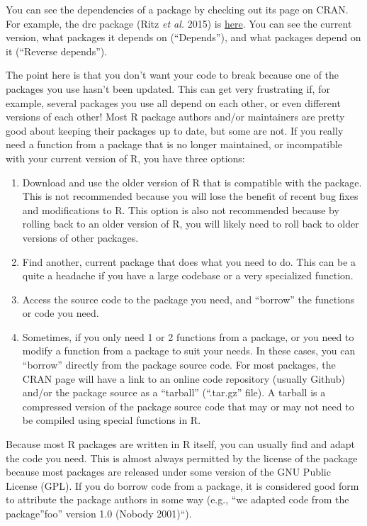 \documentclass[
  13,
  letterpaper,
]{report}
\begin{document}
You can see the dependencies of a package by checking out its page on
CRAN. For example, the drc package (Ritz \emph{et al.} 2015) is
\href{https://cran.r-project.org/web/packages/drc/index.html}{here}. You
can see the current version, what packages it depends on (``Depends''),
and what packages depend on it (``Reverse depends'').

The point here is that you don't want your code to break because one of
the packages you use hasn't been updated. This can get very frustrating
if, for example, several packages you use all depend on each other, or
even different versions of each other! Most R package authors and/or
maintainers are pretty good about keeping their packages up to date, but
some are not. If you really need a function from a package that is no
longer maintained, or incompatible with your current version of R, you
have three options:

\begin{enumerate}
\def\labelenumi{\arabic{enumi}.}
\item
  Download and use the older version of R that is compatible with the
  package. This is not recommended because you will lose the benefit of
  recent bug fixes and modifications to R. This option is also not
  recommended because by rolling back to an older version of R, you will
  likely need to roll back to older versions of other packages.
\item
  Find another, current package that does what you need to do. This can
  be a quite a headache if you have a large codebase or a very
  specialized function.
\item
  Access the source code to the package you need, and ``borrow'' the
  functions or code you need.
\item
  Sometimes, if you only need 1 or 2 functions from a package, or you
  need to modify a function from a package to suit your needs. In these
  cases, you can ``borrow'' directly from the package source code. For
  most packages, the CRAN page will have a link to an online code
  repository (usually Github) and/or the package source as a ``tarball''
  (``.tar.gz'' file). A tarball is a compressed version of the package
  source code that may or may not need to be compiled using special
  functions in R.
\end{enumerate}

Because most R packages are written in R itself, you can usually find
and adapt the code you need. This is almost always permitted by the
license of the package because most packages are released under some
version of the GNU Public License (GPL). If you do borrow code from a
package, it is considered good form to attribute the package authors in
some way (e.g., ``we adapted code from the package''foo'' version 1.0
(Nobody 2001)``).
\end{document}
